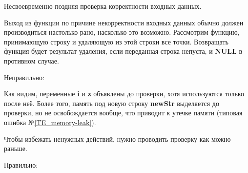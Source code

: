 \begin{typerror}
	\label{TE_too-late-condition}
	Несвоевременно поздняя проверка корректности входных данных.

	Выход из функции по причине некорректности входных данных обычно должен производиться настолько рано,
	насколько это возможно.
	Рассмотрим функцию, принимающую строку и удаляющую из этой строки все точки.
	Возвращать функция будет результат удаления, если переданная строка непуста, и \textbf{NULL} в противном случае.

	Неправильно:

	Как видим, переменные \textbf{i} и \textbf{z} объявлены до проверки, хотя используются только после неё.
	Более того, память под новую строку \textbf{newStr} выделяется до проверки, но не освобождается вообще,
	что приводит к утечке памяти (типовая ошибка №\ref{TE_memory-leak}).

	Чтобы избежать ненужных действий, нужно проводить проверку как можно раньше.

	Правильно:

\end{typerror}
